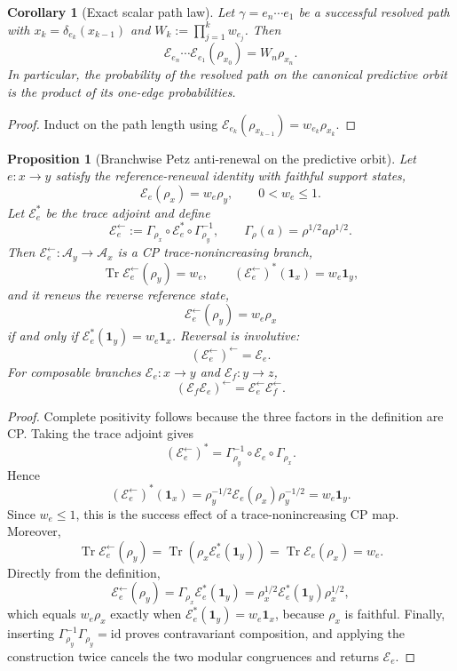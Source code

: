 \documentclass[11pt]{article}
\newtheorem{proposition}[theorem]{Proposition}
\newtheorem{corollary}[theorem]{Corollary}
\theoremstyle{definition}
\theoremstyle{remark}
\newcommand{\one}{\mathbf 1}
\newcommand{\id}{\mathrm{id}}
\newcommand{\Tr}{\operatorname{Tr}}
\newcommand{\A}{\mathcal A}
\newcommand{\E}{\mathcal E}
\begin{document}
\begin{corollary}[Exact scalar path law]
\label{cor:predictive-reference-path-law}
Let $\gamma=e_n\cdots e_1$ be a successful resolved path with
$x_k=\delta_{e_k}(x_{k-1})$ and
$W_k:=\prod_{j=1}^k w_{e_j}$.  Then
\[
 \boxed{
 \E_{e_n}\cdots\E_{e_1}(\rho_{x_0})
 =W_n\rho_{x_n}.}
\]
In particular, the probability of the resolved path on the canonical
predictive orbit is the product of its one-edge probabilities.
\end{corollary}

\begin{proof}
Induct on the path length using
$\E_{e_k}(\rho_{x_{k-1}})=w_{e_k}\rho_{x_k}$.
\end{proof}

\begin{proposition}[Branchwise Petz anti-renewal on the predictive orbit]
\label{prop:branchwise-petz-reference-renewal}
Let $e:x\to y$ satisfy the reference-renewal identity with faithful support
states,
\[
 \E_e(\rho_x)=w_e\rho_y,
 \qquad 0<w_e\le1.
\]
Let $\E_e^*$ be the trace adjoint and define
\[
 \E_e^{\leftarrow}
 :=
 \Gamma_{\rho_x}\circ\E_e^*\circ\Gamma_{\rho_y}^{-1},
 \qquad
 \Gamma_\rho(a)=\rho^{1/2}a\rho^{1/2}.
\]
Then $\E_e^{\leftarrow}:\A_y\to\A_x$ is a CP trace-nonincreasing branch,
\[
 \Tr\E_e^{\leftarrow}(\rho_y)=w_e,
 \qquad
 (\E_e^{\leftarrow})^*(\one_x)=w_e\one_y,
\]
and it renews the reverse reference state,
\[
 \E_e^{\leftarrow}(\rho_y)=w_e\rho_x
\]
if and only if $\E_e^*(\one_y)=w_e\one_x$.  Reversal is involutive:
\[
 \left(\E_e^{\leftarrow}\right)^{\leftarrow}=\E_e.
\]
For composable branches $\E_e:x\to y$ and $\E_f:y\to z$,
\[
 (\E_f\E_e)^{\leftarrow}
 =\E_e^{\leftarrow}\E_f^{\leftarrow}.
\]
\end{proposition}

\begin{proof}
Complete positivity follows because the three factors in the definition are
CP.  Taking the trace adjoint gives
\[
 (\E_e^{\leftarrow})^*
 =\Gamma_{\rho_y}^{-1}\circ\E_e\circ\Gamma_{\rho_x}.
\]
Hence
\[
 (\E_e^{\leftarrow})^*(\one_x)
 =\rho_y^{-1/2}\E_e(\rho_x)\rho_y^{-1/2}
 =w_e\one_y.
\]
Since $w_e\le1$, this is the success effect of a trace-nonincreasing CP map.
Moreover,
\[
 \Tr\E_e^{\leftarrow}(\rho_y)
 =\Tr\!\left(\rho_x\E_e^*(\one_y)\right)
 =\Tr\E_e(\rho_x)=w_e.
\]
Directly from the definition,
\[
 \E_e^{\leftarrow}(\rho_y)
 =\Gamma_{\rho_x}\E_e^*(\one_y)
 =\rho_x^{1/2}\E_e^*(\one_y)\rho_x^{1/2},
\]
which equals $w_e\rho_x$ exactly when
$\E_e^*(\one_y)=w_e\one_x$, because $\rho_x$ is faithful.  Finally,
inserting
$\Gamma_{\rho_y}^{-1}\Gamma_{\rho_y}=\id$ proves contravariant composition,
and applying the construction twice cancels the two modular congruences and
returns $\E_e$.
\end{proof}
\end{document}
